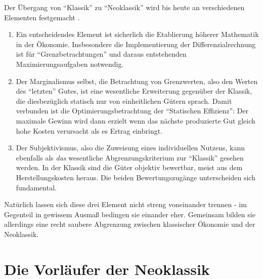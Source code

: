 Der Übergang von "`Klassik"' zu "`Neoklassik"' wird bis heute an verschiedenen Elementen festgemacht \parencite[S. 198]{Ekelund2002}.
\begin{enumerate}
	\item Ein entscheidendes Element ist sicherlich die Etablierung höherer Mathematik in der Ökonomie. Insbesondere die Implementierung der Differenzialrechnung ist für "`Grenzbetrachtungen"' und daraus entstehenden Maximierungsaufgaben notwendig.
	\item Der Marginalismus selbst, die Betrachtung von Grenzwerten, also den Werten des "`letzten"' Gutes, ist eine wesentliche Erweiterung gegenüber der Klassik, die diesbezüglich statisch nur von einheitlichen Gütern sprach. Damit verbunden ist die Optimierungsbetrachtung der "`Statischen Effizienz"': Der maximale Gewinn wird dann erzielt wenn das nächste produzierte Gut gleich hohe Kosten verursacht als es Ertrag einbringt. 
	\item Der Subjektivismus, also die Zuweisung eines individuellen Nutzens, kann ebenfalls als \textit{das} wesentliche Abgrenzungskriterium zur "`Klassik"' gesehen werden. In der Klassik sind die Güter objektiv bewertbar, meist aus dem Herstellungskosten heraus. Die beiden Bewertungszugänge unterscheiden sich fundamental.
\end{enumerate}

Natürlich lassen sich diese drei Element nicht streng voneinander trennen - im Gegenteil in gewissem Ausmaß bedingen sie einander eher. Gemeinsam bilden sie allerdings eine recht saubere Abgrenzung zwischen klassischer Ökonomie und der Neoklassik.


\section{Die Vorläufer der Neoklassik}
\label{Vorläufer}

